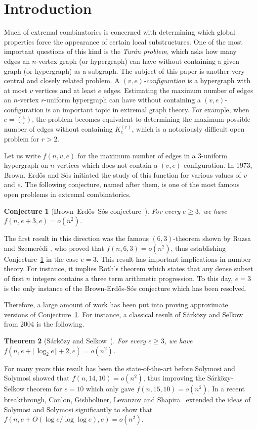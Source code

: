 \documentclass{daj}
\theoremstyle{plain}
\newtheorem{theorem}{Theorem}[section]
\newtheorem{conjecture}[theorem]{Conjecture}
\theoremstyle{remark}
\begin{document}
\section{Introduction}

Much of extremal combinatorics is concerned with determining which global properties force the appearance of certain local substructures. One of the most important questions of this kind is the \emph{Tur\'an problem}, which asks how many edges an $n$-vertex graph (or hypergraph) can have without containing a given graph (or hypergraph) as a subgraph. The subject of this paper is another very central and closely related problem. A \emph{$(v,e)$-configuration} is a hypergraph with at most $v$ vertices and at least $e$ edges. Estimating the maximum number of edges an $n$-vertex $r$-uniform hypergraph can have without containing a $(v,e)$-configuration is an important topic in extremal graph theory. For example, when $e=\binom{v}{r}$, the problem becomes equivalent to determining the maximum possible number of edges without containing $K_v^{(r)}$, which is a notoriously difficult open problem for $r>2$.

Let us write $f(n, v, e)$ for the maximum number of edges in a $3$-uniform hypergraph on $n$ vertices which does not contain a $(v, e)$-configuration. In 1973, Brown, Erd\H os and S\' os \cite{BES73,BES73_2} initiated the study of this function for various values of $v$ and $e$. The following conjecture, named after them, is one of the most famous open problems in extremal combinatorics.

\begin{conjecture}[Brown--Erd\H os--S\'os conjecture~\cite{BES73,BES73_2}] \label{conj:BESConj}
    For every $e\geq 3$, we have $f(n,e+3,e)=o(n^2)$.
\end{conjecture}

The first result in this direction was the famous $(6, 3)$-theorem shown by Ruzsa and Szemer\'edi \cite{RS76}, who proved that $f(n, 6, 3)=o(n^2)$, thus establishing Conjecture~\ref{conj:BESConj} in the case $e=3$. 
This result has important implications in number theory. For instance, it implies Roth's theorem which states that any dense subset of first $n$ integers contains a three term arithmetic progression.
To this day, $e=3$ is the only instance of the Brown-Erd\H{o}s-S\'os conjecture which has been resolved. 

Therefore, a large amount of work has been put into proving approximate versions of Conjecture~\ref{conj:BESConj}. For instance, a classical result of S\'ark\"ozy and Selkow \cite{SS04} from 2004 is the following.
\begin{theorem}[S\'ark\"ozy and Selkow~\cite{SS04}]
For every $e \ge 3$, we have  $f(n, e+\lfloor \log_2 e\rfloor +2, e)=o(n^2)$.
\end{theorem}
For many years this result has been the state-of-the-art before Solymosi and Solymosi \cite{SS17} showed that $f(n, 14, 10)=o(n^2)$, thus improving the S\'ark\"ozy-Selkow theorem for $e=10$ which only gave $f(n, 15, 10)=o(n^2)$. In a recent breakthrough, Conlon, Gishboliner, Levanzov and Shapira~\cite{CGLS23} extended the ideas of Solymosi and Solymosi significantly to show that $f(n, e+O(\log e/\log\log e), e)=o(n^2)$. 
\end{document}
